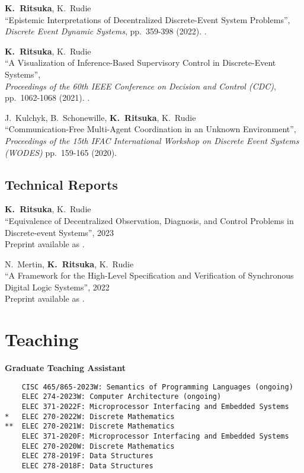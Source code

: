 \documentclass[margin]{res}
\begin{document}
\begin{resume}
{\bf K.~Ritsuka}, K.~Rudie\\
``Epistemic Interpretations of Decentralized Discrete-Event System Problems'',\\
\emph{Discrete Event Dynamic Systems}, pp.~359-398 (2022).
.

{\bf K.~Ritsuka}, K.~Rudie\\
``A Visualization of Inference-Based Supervisory Control in Discrete-Event Systems'',\\
\emph{Proceedings of the 60th IEEE Conference on Decision and Control (CDC)}, pp.~1062-1068 (2021).
.

J.~Kulchyk, B.~Schonewille, {\bf K.~Ritsuka}, K.~Rudie\\
``Communication-Free Multi-Agent Coordination in an Unknown Environment'',\\
\emph{Proceedings of the 15th IFAC International Workshop on Discrete Event Systems (WODES)}
pp.~159-165 (2020).

\subsection{Technical Reports}

{\bf K.~Ritsuka}, K.~Rudie\\
``Equivalence of Decentralized Observation, Diagnosis, and Control Problems in Discrete-event Systems'',
2023\\
Preprint available as .

N.~Mertin, {\bf K.~Ritsuka}, K.~Rudie\\
``A Framework for the High-Level Specification and Verification of Synchronous Digital Logic Systems'',
2022\\
Preprint available as .


\section{Teaching}

\textbf{Graduate Teaching Assistant}

\begin{lstlisting}
    CISC 465/865-2023W: Semantics of Programming Languages (ongoing)
    ELEC 274-2023W: Computer Architecture (ongoing)
    ELEC 371-2022F: Microprocessor Interfacing and Embedded Systems
*   ELEC 270-2022W: Discrete Mathematics
**  ELEC 270-2021W: Discrete Mathematics
    ELEC 371-2020F: Microprocessor Interfacing and Embedded Systems
    ELEC 270-2020W: Discrete Mathematics
    ELEC 278-2019F: Data Structures
    ELEC 278-2018F: Data Structures


\end{lstlisting}
\end{resume}
\end{document}
